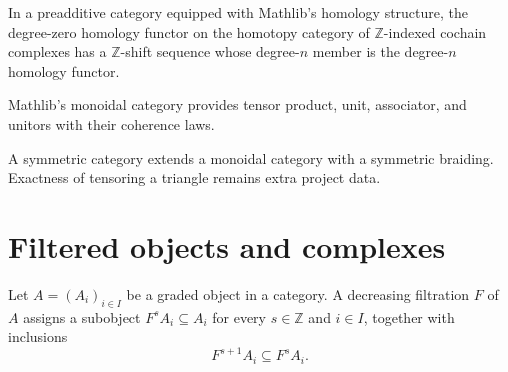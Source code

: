 \begin{definition}
  \label{def:mathlib-homotopy-cochain-homology-shift-sequence}
  \mathlibok
  In a preadditive category equipped with Mathlib's homology structure, the
  degree-zero homology functor on the homotopy category of $\mathbb Z$-indexed
  cochain complexes has a $\mathbb Z$-shift sequence whose degree-$n$ member is
  the degree-$n$ homology functor.
\end{definition}

\begin{definition}
  \label{def:mathlib-monoidal-category}
  \mathlibok
  Mathlib's monoidal category provides tensor product, unit, associator, and
  unitors with their coherence laws.
\end{definition}

\begin{definition}
  \label{def:mathlib-symmetric-category}
  \mathlibok
  A symmetric category extends a monoidal category with a symmetric braiding.
  Exactness of tensoring a triangle remains extra project data.
\end{definition}

\section{Filtered objects and complexes}

\begin{definition}
  \leanok
  \label{def:core-filtration}
  Let $A=(A_i)_{i\in I}$ be a graded object in a category.  A decreasing
  filtration $F$ of $A$ assigns a subobject $F^sA_i\subseteq A_i$ for every
  $s\in\mathbb Z$ and $i\in I$, together with inclusions
  \[
    F^{s+1}A_i\subseteq F^sA_i.
  \]
\end{definition}

